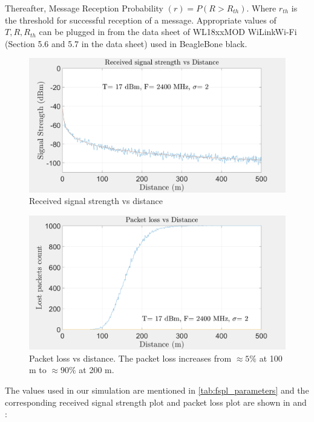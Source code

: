 Thereafter, Message Reception Probability $(r) = P(R > R_{th})$. Where $r_{th}$ is the threshold for successful reception of a message. Appropriate values of $T, R, R_{th}$ can be plugged in from the data sheet of WL18xxMOD WiLink\texttrademark Wi-Fi\textregistered   \cite{wilink} (Section 5.6 and 5.7 in the data sheet) used in BeagleBone black.

\begin{figure}[hbtp]
\centering
\includegraphics[width=1\textwidth]{ncsuthesis-0.6/Chapter-4/figs/signal_strength}
\caption{Received signal strength vs distance}
\label{fig:signal_strength}
\end{figure}

\begin{figure}[hbtp]
\centering
\includegraphics[width=1\textwidth]{ncsuthesis-0.6/Chapter-4/figs/packet_loss}
\caption{Packet loss vs distance. The packet loss increases from $\approx 5\%$ at 100 m to $\approx 90\%$ at 200 m.}
\label{fig:packet_loss}
\end{figure}
The values used in our simulation are mentioned in \ref{tab:fspl_parameters} and the corresponding received signal strength plot and packet loss plot are shown in  and :

